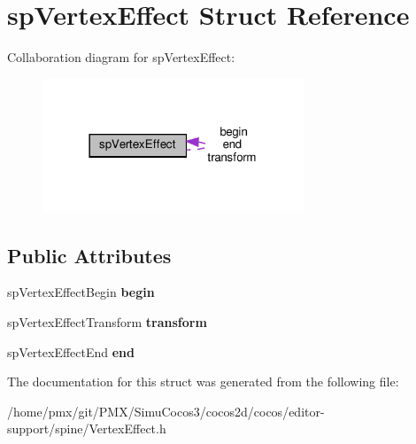 \hypertarget{structspVertexEffect}{}\section{sp\+Vertex\+Effect Struct Reference}
\label{structspVertexEffect}


Collaboration diagram for sp\+Vertex\+Effect\+:
\nopagebreak
\begin{figure}[H]
\begin{center}
\leavevmode
\includegraphics[width=222pt]{structspVertexEffect__coll__graph}
\end{center}
\end{figure}
\subsection*{Public Attributes}
\begin{DoxyCompactItemize}
\item 
\mbox{\label{structspVertexEffect_a30428f20a21ba5e7811677d2cf49524e}} 
sp\+Vertex\+Effect\+Begin {\bfseries begin}
\item 
\mbox{\label{structspVertexEffect_a8bf9a1545a44022c4232427f54c37649}} 
sp\+Vertex\+Effect\+Transform {\bfseries transform}
\item 
\mbox{\label{structspVertexEffect_a45ace24d20ec2a77615772cc64664d0c}} 
sp\+Vertex\+Effect\+End {\bfseries end}
\end{DoxyCompactItemize}


The documentation for this struct was generated from the following file\+:\begin{DoxyCompactItemize}
\item 
/home/pmx/git/\+P\+M\+X/\+Simu\+Cocos3/cocos2d/cocos/editor-\/support/spine/Vertex\+Effect.\+h\end{DoxyCompactItemize}
